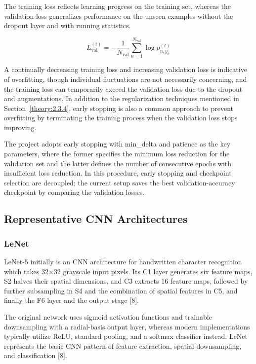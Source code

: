 The training loss reflects learning progress on the training set, whereas the validation loss generalizes performance on the unseen examples without the dropout layer and with running statistics.

\[
{ L}_{\mathrm{val}}^{\left( t\right) }=-\frac{1}{{N}_{\mathrm{val}}}\sum _{n=1}^{{N}_{\mathrm{val}}} \log {p}_{n,{y}_{n}}^{\left( t\right) }
\]

A continually decreasing training loss and increasing validation loss is indicative of overfitting, though individual fluctuations are not necessarily concerning, and the training loss can temporarily exceed the validation loss due to the dropout and augmentations. In addition to the regularization techniques mentioned in Section~\ref{theory:2.3.4}, early stopping is also a common approach to prevent overfitting by terminating the training process when the validation loss stops improving.

The project adopts early stopping with min\_delta and patience as the key parameters, where the former specifies the minimum loss reduction for the validation set and the latter defines the number of consecutive epochs with insufficient loss reduction. In this procedure, early stopping and checkpoint selection are decoupled; the current setup saves the best validation-accuracy checkpoint by comparing the validation losses.

\subsection{Representative CNN Architectures}\label{theory:2.5}

\subsubsection{LeNet}\label{theory:2.5.1}

LeNet-5 initially is an CNN architecture for handwritten character recognition which takes 32\(\times\)32 grayscale input pixels. Its C1 layer generates six feature maps, S2 halves their spatial dimensions, and C3 extracts 16 feature maps, followed by further subsampling in S4 and the combination of spatial features in C5, and finally the F6 layer and the output stage [8].

The original network uses sigmoid activation functions and trainable downsampling with a radial-basis output layer, whereas modern implementations typically utilize ReLU, standard pooling, and a softmax classifier instead. LeNet represents the basic CNN pattern of feature extraction, spatial downsampling, and classification [8].

